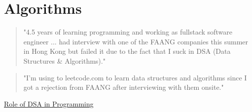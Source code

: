 \section{Algorithms}


\begin{quote}
	"4.5 years of learning programming and working as fullstack software engineer ... had interview with one of the FAANG companies this summer in Hong Kong but failed it due to the fact that I suck in DSA (Data Structures \& Algorithms)."
\end{quote}

\begin{quote}
	"I'm using to leetcode.com to learn data structures
	and algorithms since I got a rejection from FAANG after interviewing with them onsite."
\end{quote}

\href{https://blog.codechef.com/2020/07/24/the-role-of-data-structure-and-algorithms-in-programming/}{Role of DSA in Programming}
